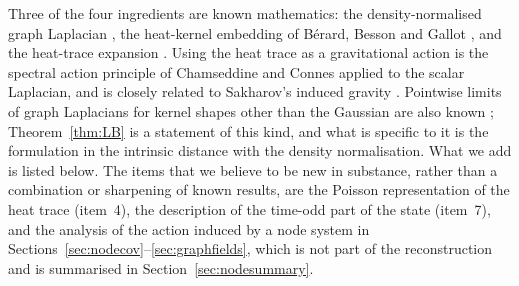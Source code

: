 \documentclass[11pt,a4paper]{article}
\theoremstyle{stmt}
\theoremstyle{defn}
\theoremstyle{rmk}
\numberwithin{equation}{section}
\begin{document}
Three of the four ingredients are known mathematics: the density-normalised graph Laplacian \cite{CoifmanLafon,BelkinNiyogi,HAvL,THJ,ChengWu,BIK,GTGHS}, the heat-kernel embedding of B\'erard, Besson and Gallot \cite{BBG}, and the heat-trace expansion \cite{Gilkey}. Using the heat trace as a gravitational action is the spectral action principle of Chamseddine and Connes \cite{CC97} applied to the scalar Laplacian, and is closely related to Sakharov's induced gravity \cite{Sakharov,Visser}. Pointwise limits of graph Laplacians for kernel shapes other than the Gaussian are also known \cite{HAvL,THJ}; Theorem~\ref{thm:LB} is a statement of this kind, and what is specific to it is the formulation in the intrinsic distance with the density normalisation. What we add is listed below. The items that we believe to be new in substance, rather than a combination or sharpening of known results, are the Poisson representation of the heat trace (item~4), the description of the time-odd part of the state (item~7), and the analysis of the action induced by a node system in Sections~\ref{sec:nodecov}--\ref{sec:graphfields}, which is not part of the reconstruction and is summarised in Section~\ref{sec:nodesummary}.
\end{document}
